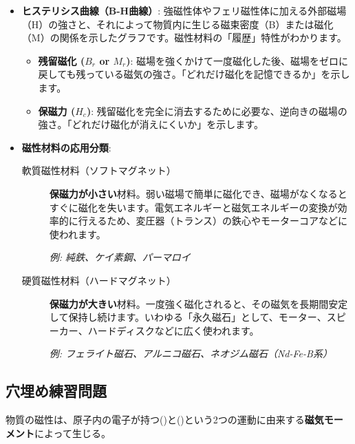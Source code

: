 \documentclass[11pt,a4paper]{ltjsarticle}
\newcommand{\blank}[1][3cm]{\underline{\hspace{#1}}}
\begin{document}
\begin{itemize}
    \item \textbf{ヒステリシス曲線（B-H曲線）}: 強磁性体やフェリ磁性体に加える外部磁場（H）の強さと、それによって物質内に生じる磁束密度（B）または磁化（M）の関係を示したグラフです。磁性材料の「履歴」特性がわかります。
        \begin{itemize}
            \item \textbf{残留磁化 ($B_r$ or $M_r$)}: 磁場を強くかけて一度磁化した後、磁場をゼロに戻しても残っている磁気の強さ。「どれだけ磁化を記憶できるか」を示します。
            \item \textbf{保磁力 ($H_c$)}: 残留磁化を完全に消去するために必要な、逆向きの磁場の強さ。「どれだけ磁化が消えにくいか」を示します。
        \end{itemize}
    \item \textbf{磁性材料の応用分類}:
        \begin{description}
            \item[軟質磁性材料（ソフトマグネット）]
            \textbf{保磁力が小さい}材料。弱い磁場で簡単に磁化でき、磁場がなくなるとすぐに磁化を失います。電気エネルギーと磁気エネルギーの変換が効率的に行えるため、変圧器（トランス）の鉄心やモーターコアなどに使われます。

            \textit{例: 純鉄、ケイ素鋼、パーマロイ}
            \item[硬質磁性材料（ハードマグネット）]
            \textbf{保磁力が大きい}材料。一度強く磁化されると、その磁気を長期間安定して保持し続けます。いわゆる「永久磁石」として、モーター、スピーカー、ハードディスクなどに広く使われます。

            \textit{例: フェライト磁石、アルニコ磁石、ネオジム磁石（Nd-Fe-B系）}
        \end{description}
\end{itemize}

\subsection{穴埋め練習問題}
物質の磁性は、原子内の電子が持つ(\blank[1.5cm])と(\blank[2cm])という2つの運動に由来する\textbf{磁気モーメント}によって生じる。
\end{document}
